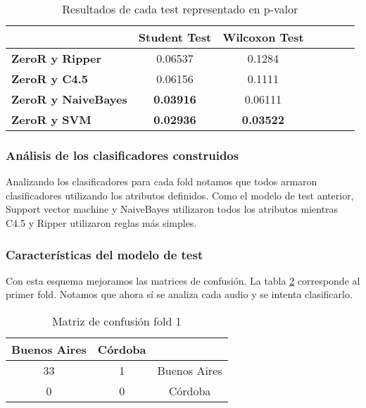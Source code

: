 \begin{table}[H]
	\centering
	\begin{tabular}{|l|c|c|c|c|c|c|}
		\hline
		\textbf{}  & \textbf{Student Test} & \textbf{Wilcoxon Test} \\ \hline
		\textbf{ZeroR y Ripper}  & 0.06537 & 0.1284 \\ \hline
		\textbf{ZeroR y C4.5}  & 0.06156 &  0.1111 \\ \hline
		\textbf{ZeroR y NaiveBayes}  & \textbf{0.03916} & 0.06111 \\ \hline
		\textbf{ZeroR y SVM}  &  \textbf{0.02936} & \textbf{0.03522} \\ \hline
	\end{tabular}
	\caption{Resultados de cada test representado en p-valor}
	\label{PAHD_res_tests_wilcoxon_student}
\end{table}

\subsubsection{Análisis de los clasificadores construidos}

Analizando los clasificadores para cada fold notamos que todos armaron clasificadores utilizando los atributos definidos. Como el modelo de test anterior, Support vector machine y NaiveBayes utilizaron todos los atributos mientras C4.5 y Ripper utilizaron reglas más simples.

\subsubsection{Características del modelo de test}

Con esta esquema mejoramos las matrices de confusión. La tabla \ref{PAHD_mat_conf_f1} corresponde al primer fold. Notamos que ahora sí se analiza cada audio y se intenta clasificarlo. 

\begin{table}[H]
	\centering
	\begin{tabular}{|c|c|c|}
		\hline
		Buenos Aires & Córdoba & \\ \hline
		33 & 1 & Buenos Aires\\ \hline
		0 & 0 & Córdoba\\ \hline
	\end{tabular}
	\caption{Matriz de confusión fold 1}
	\label{PAHD_mat_conf_f1}
\end{table}
